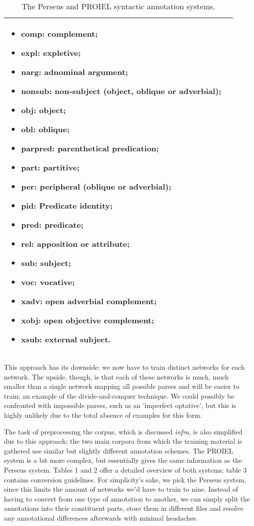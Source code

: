 \begin{table}
\begin{tabular}{|l|l|}
\begin{minipage}{2.5in}
\begin{itemize}[noitemsep,topsep=0pt,parsep=0pt,partopsep=0pt]
      \item comp: complement;
      \item expl: expletive;
      \item narg: adnominal argument;
      \item nonsub: non-subject (object, oblique or adverbial);
      \item obj: object;
      \item obl: oblique;
      \item parpred: parenthetical predication;
      \item part: partitive;
      \item per: peripheral (oblique or adverbial);
      \item pid: Predicate identity;
      \item pred: predicate;
      \item rel: apposition or attribute;
      \item sub: subject;
      \item voc: vocative;
      \item xadv: open adverbial complement;
      \item xobj: open objective complement;
      \item xsub: external subject.
      \end{itemize}
    \end{minipage} \\ \hline
  \end{tabular}
  \caption{The Perseus and PROIEL syntactic annotation systems.} \label{table:proielmorph}
\end{table}

This approach has its downside: we now have to train distinct networks
for each network. The upside, though, is that each of these networks
is much, much smaller than a single network mapping all possible
parses and will be easier to train; an example of the
divide-and-conquer technique. We could possibly be confronted with
impossible parses, such as an 'imperfect optative', but this is highly
unlikely due to the total absence of examples for this form.

The task of preprocessing the corpus, which is discussed
\textit{infra}, is also simplified due to this approach: the two main
corpora from which the training material is gathered use similar but
slightly different annotation schemes. The PROIEL system is a bit more
complex, but essentially gives the same information as the Perseus
system. Tables 1 and 2 offer a detailed overview of both systems;
table 3 contains conversion guidelines. For simplicity's sake, we pick
the Perseus system, since this limits the amount of networks we'd have
to train to nine. Instead of having to convert from one type of
annotation to another, we can simply split the annotations into their
constituent parts, store them in different files and resolve any
annotational differences afterwards with minimal headaches.

